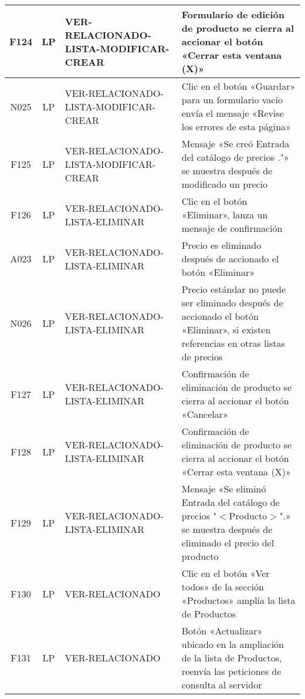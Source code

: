\begin{landscape}
{\begin{longtable}[htb]{|c|c|p{3.8cm}|p{15.2cm}|}
\scriptsize{F124} & \scriptsize{LP} & \scriptsize{VER-RELACIONADO-LISTA-MODIFICAR-CREAR} & \scriptsize{Formulario de edición de producto se cierra al accionar el botón «Cerrar esta ventana (X)»} \\ \hline
\scriptsize{N025} & \scriptsize{LP} & \scriptsize{VER-RELACIONADO-LISTA-MODIFICAR-CREAR} & \scriptsize{Clic en el botón «Guardar» para un formulario vacío envía el mensaje «Revise los errores de esta página»} \\ \hline
\scriptsize{F125} & \scriptsize{LP} & \scriptsize{VER-RELACIONADO-LISTA-MODIFICAR-CREAR} & \scriptsize{Mensaje «Se creó Entrada del catálogo de precios ."» se muestra después de modificado un precio} \\ \hline
\scriptsize{F126} & \scriptsize{LP} & \scriptsize{VER-RELACIONADO-LISTA-ELIMINAR} & \scriptsize{Clic en el botón «Eliminar», lanza un mensaje de confirmación} \\ \hline
\scriptsize{A023} & \scriptsize{LP} & \scriptsize{VER-RELACIONADO-LISTA-ELIMINAR} & \scriptsize{Precio es eliminado después de accionado el botón «Eliminar»} \\ \hline
\scriptsize{N026} & \scriptsize{LP} & \scriptsize{VER-RELACIONADO-LISTA-ELIMINAR} & \scriptsize{Precio estándar no puede ser eliminado después de accionado el botón «Eliminar», si existen referencias en otras listas de precios} \\ \hline
\scriptsize{F127} & \scriptsize{LP} & \scriptsize{VER-RELACIONADO-LISTA-ELIMINAR} & \scriptsize{Confirmación de eliminación de producto se cierra al accionar el botón «Cancelar»} \\ \hline
\scriptsize{F128} & \scriptsize{LP} & \scriptsize{VER-RELACIONADO-LISTA-ELIMINAR} & \scriptsize{Confirmación de eliminación de producto se cierra al accionar el botón «Cerrar esta ventana (X)»} \\ \hline
\scriptsize{F129} & \scriptsize{LP} & \scriptsize{VER-RELACIONADO-LISTA-ELIMINAR} & \scriptsize{Mensaje «Se eliminó Entrada del catálogo de precios "$<$Producto$>$".» se muestra después de eliminado el precio del producto} \\ \hline
\scriptsize{F130} & \scriptsize{LP} & \scriptsize{VER-RELACIONADO} & \scriptsize{Clic en el botón «Ver todos» de la sección «Productos» amplía la lista de Productos} \\ \hline
\scriptsize{F131} & \scriptsize{LP} & \scriptsize{VER-RELACIONADO} & \scriptsize{Botón «Actualizar» ubicado en la ampliación de la lista de Productos, reenvía las peticiones de consulta al servidor} \\ \hline

\end{longtable}}
\end{landscape}
